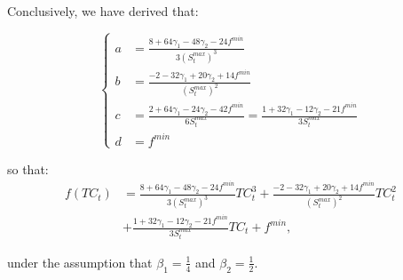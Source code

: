 \documentclass[12pt]{article}
\begin{document}
\begin{appendices}
		Conclusively, we have derived that:
		
        \begin{equation} \label{eq:cubic_a_b_c}
		    \begin{cases}
		        a &= \frac{8 + 64\gamma_1 - 48\gamma_2 -24f^{min}}{3\left(S^{max}_t\right)^3} \\
		        b &= \frac{-2 - 32\gamma_1 + 20\gamma_2 + 14f^{min}}{\left(S^{max}_t\right)^2} \\
		        c &= \frac{2 + 64\gamma_1 - 24\gamma_2 - 42f^{min}}{6S^{max}_t} = \frac{1 + 32\gamma_1 - 12\gamma_2 - 21f^{min}}{3S^{max}_t} \\
		        d &= f^{min}
		    \end{cases}
		\end{equation}
		
		\noindent so that:
		\begin{align*}
		f(TC_t) &= \frac{8 + 64\gamma_1 - 48\gamma_2 -24f^{min}}{3\left(S^{max}_t\right)^3}TC_t^3 + \frac{-2 - 32\gamma_1 + 20\gamma_2 + 14f^{min}}{\left(S^{max}_t\right)^2}TC_t^2 \\
		&+ \frac{1 + 32\gamma_1 - 12\gamma_2 - 21f^{min}}{3S^{max}_t}TC_t + f^{min},
		\end{align*}
		
		\noindent under the assumption that $\beta_1 = \frac{1}{4}$ and $\beta_2 = \frac{1}{2}$.
	
	\end{appendices}
	
\end{document}
